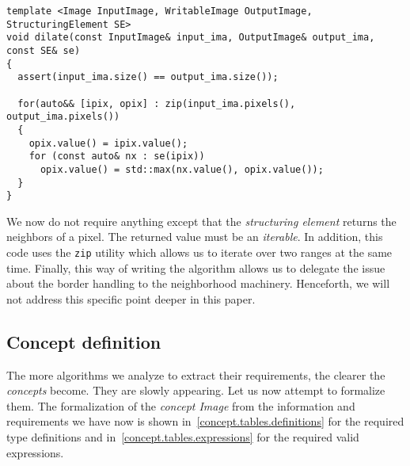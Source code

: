 \begin{verbatim}
template <Image InputImage, WritableImage OutputImage, StructuringElement SE>
void dilate(const InputImage& input_ima, OutputImage& output_ima, const SE& se)
{
  assert(input_ima.size() == output_ima.size());

  for(auto&& [ipix, opix] : zip(input_ima.pixels(), output_ima.pixels())
  {
    opix.value() = ipix.value();
    for (const auto& nx : se(ipix))
      opix.value() = std::max(nx.value(), opix.value());
  }
}
\end{verbatim}

\noindent We now do not require anything except that the \emph{structuring element} returns the neighbors of a pixel.
The returned value must be an \emph{iterable}. In addition, this code uses the \texttt{zip} utility which allows us to
iterate over two ranges at the same time. Finally, this way of writing the algorithm allows us to delegate the issue
about the border handling to the neighborhood machinery. Henceforth, we will not address this specific point deeper in
this paper.

\subsection{Concept definition}
\label{image_and_algorithms_taxonomy.rewriting.subsec.concept}

The more algorithms we analyze to extract their requirements, the clearer the \emph{concepts} become. They are slowly
appearing. Let us now attempt to formalize them. The formalization of the \emph{concept Image} from the information and
requirements we have now is shown in~\cref{concept.tables.definitions} for the required type definitions and
in~\cref{concept.tables.expressions} for the required valid expressions.


